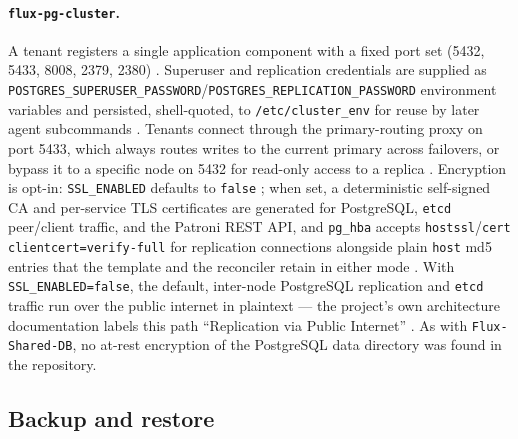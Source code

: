 \paragraph{\texttt{flux-\allowbreak{}pg-\allowbreak{}cluster}.} A tenant registers a single \FluxOS application
component with a fixed port set (5432, 5433, 8008, 2379, 2380)
. Superuser and replication credentials are
supplied as \texttt{POSTGRES\_SUPERUSER\_PASSWORD}\slash\texttt{POSTGRES\_REPLICATION\_PASSWORD}
environment variables and persisted, shell-quoted, to \texttt{/\allowbreak{}etc/\allowbreak{}cluster\_env} for
reuse by later agent subcommands
. Tenants connect through
the primary-routing proxy on port 5433, which always routes writes to the current
primary across failovers, or bypass it to a specific node on 5432 for read-only access
to a replica . Encryption is opt-in:
\texttt{SSL\_ENABLED} defaults to \texttt{false}
; when set, a deterministic
self-signed CA and per-service TLS certificates are generated for PostgreSQL,
\texttt{etcd} peer/client traffic, and the Patroni REST API, and \texttt{pg\_hba}
accepts \texttt{hostssl}\slash\texttt{cert clientcert=verify-\allowbreak{}full} for replication
connections alongside plain \texttt{host} md5 entries that the template and the
reconciler retain in either mode 
. With \texttt{SSL\_ENABLED=\allowbreak{}false}, the
default, inter-node PostgreSQL replication and \texttt{etcd} traffic run over the
public internet in plaintext --- the project's own architecture documentation labels
this path ``Replication via Public Internet'' .
As with \texttt{Flux-Shared-DB}, no at-rest encryption of the PostgreSQL data directory
was found in the repository.

\subsection{Backup and restore}
\label{subsec:managed-db-backup}

